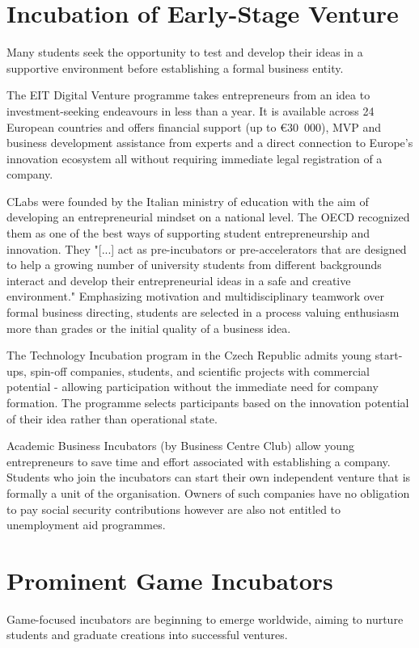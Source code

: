 \section{Incubation of Early-Stage Venture}
Many students seek the opportunity to test and develop their ideas in a supportive environment before establishing a formal business entity.

The EIT Digital Venture programme takes entrepreneurs from an idea to investment-seeking endeavours in less than a year. It is available across 24 European countries and offers financial support (up to €30~000), MVP and business development assistance from experts and a direct connection to Europe's innovation ecosystem all without requiring immediate legal registration of a company.

CLabs were founded by the Italian ministry of education with the aim of developing an entrepreneurial mindset on a national level. The OECD recognized them as one of the best ways of supporting student entrepreneurship and innovation. They "[...] act as pre-incubators or pre-accelerators that are designed to help a growing number of university students from different backgrounds interact and develop their entrepreneurial ideas in a safe and creative environment." Emphasizing motivation and multidisciplinary teamwork over formal business directing, students are selected in a process valuing enthusiasm more than grades or the initial quality of a business idea.

The Technology Incubation program in the Czech Republic admits young start-ups, spin-off companies, students, and scientific projects with commercial potential - allowing participation without the immediate need for company formation. The programme selects participants based on the innovation potential of their idea rather than operational state.

Academic Business Incubators (by Business Centre Club) allow young entrepreneurs to save time and effort associated with establishing a company. Students who join the incubators can start their own independent venture that is formally a unit of the organisation. Owners of such companies have no obligation to pay social security contributions however are also not entitled to unemployment aid programmes.

\section{Prominent Game Incubators}
Game-focused incubators are beginning to emerge worldwide, aiming to nurture students and graduate creations into successful ventures. 

